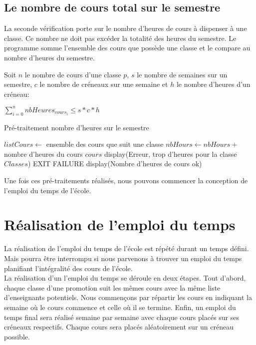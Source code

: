 \documentclass[12pt,a4paper,french]{article}
\begin{document}
\newpage

\subsection{Le nombre de cours total sur le semestre}
La seconde vérification porte sur le nombre d'heures de cours à dispenser à une classe. Ce nombre ne doit pas excéder la totalité des heures du semestre. Le programme somme l'ensemble des cours que possède une classe et le compare au nombre d'heures du semestre.

Soit $n$ le nombre de cours d'une classe $p$, $s$ le nombre de semaines sur un semestre, $c$ le nombre de créneaux sur une semaine et $h$ le nombre d'heures d'un créneau: 

\begin{center}
$\sum_{i=0}^n nbHeures_{cours_i} \leq s*c*h$
\end{center}

\begin{algorithm}
\caption{Pré-traitement nombre d'heures sur le semestre}
\begin{algorithmic}
\STATE $listCours \leftarrow$ ensemble des cours que suit une classe
\STATE $nbHours \leftarrow nbHours +$ nombre d'heures du cours $cours$
\ENDFOR
{}
\STATE display(Erreur, trop d'heures pour la classe $Classes$)
\STATE EXIT FAILURE
\ENDIF
\ENDFOR
\STATE display(Nombre d'heures de cours ok)
\end{algorithmic}
\end{algorithm}

Une fois ces pré-traitements réalisés, nous pouvons commencer la conception de l'emploi du temps de l'école.

\newpage
\section{Réalisation de l'emploi du temps}
La réalisation de l'emploi du temps de l'école est répété durant un temps défini. Mais pourra être interrompu si nous parvenons à trouver un emploi du temps planifiant l'intégralité des cours de l'école.\\
La réalisation d'un l'emploi du temps se déroule en deux étapes. Tout d'abord, chaque classe d'une promotion suit les mêmes cours avec la même liste d'enseignants potentiels. Nous commençons par répartir les cours en indiquant la semaine où le cours commence et celle où il se termine. 
Enfin, un emploi du temps final sera réalisé semaine par semaine avec chaque cours placés sur ses créneaux respectifs. Chaque cours sera placés aléatoirement sur un créneau possible.
\end{document}
